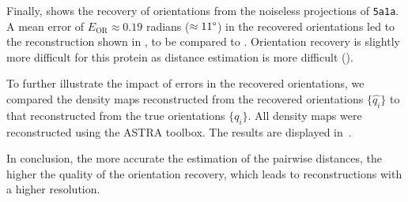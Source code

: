 Finally,  shows the recovery of orientations from the noiseless projections of \texttt{5a1a}.
A mean error of $E_\text{OR} \approx 0.19$ radians ($\approx 11\degree$) in the recovered orientations led to the reconstruction shown in , to be compared to .
Orientation recovery is slightly more difficult for this protein as distance estimation is more difficult ().

To further illustrate the impact of errors in the recovered orientations, we compared the density maps reconstructed from the recovered orientations $\{ \widehat{q_i} \}$ to that reconstructed from the true orientations $\{ q_i \}$. All density maps were reconstructed using the ASTRA toolbox. The results are displayed in~. 

In conclusion, the more accurate the estimation of the pairwise distances, the higher the quality of the orientation recovery, which leads to reconstructions with a higher resolution. %

